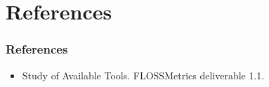 \documentclass{beamer}
\begin{document}
\section{References}

\begin{frame}
 \frametitle{References}
 \begin{itemize}
  \item Study of Available Tools. FLOSSMetrics deliverable 1.1.
 \end{itemize}

\end{frame}
\end{document}
